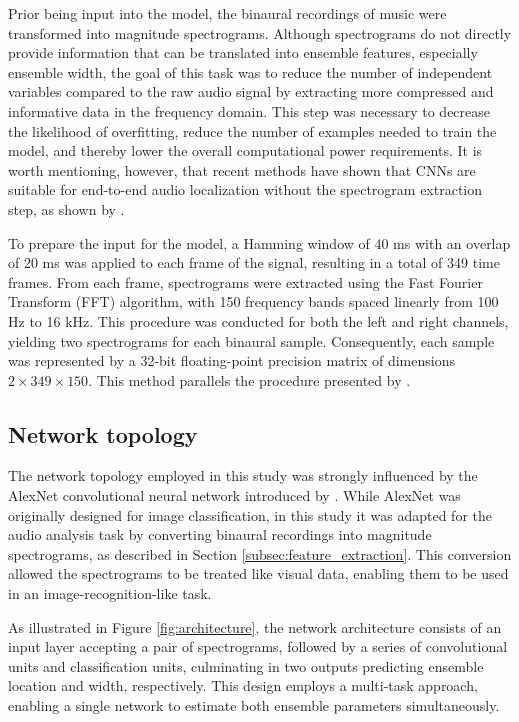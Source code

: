 \documentclass[11pt]{article}
\begin{document}
Prior being input into the model, the binaural recordings of music were transformed into magnitude spectrograms. Although spectrograms do not directly provide information that can be translated into ensemble features, especially ensemble width, the goal of this task was to reduce the number of independent variables compared to the raw audio signal by extracting more compressed and informative data in the frequency domain. This step was necessary to decrease the likelihood of overfitting, reduce the number of examples needed to train the model, and thereby lower the overall computational power requirements. It is worth mentioning, however, that recent methods have shown that CNNs are suitable for end-to-end audio localization without the spectrogram extraction step, as shown by \textcite{vera-diaz_towards_2018, vecchiotti_end--end_2019}.

To prepare the input for the model, a Hamming window of 40 ms with an overlap of 20 ms was applied to each frame of the signal, resulting in a total of 349 time frames. From each frame, spectrograms were extracted using the Fast Fourier Transform (FFT) algorithm, with 150 frequency bands spaced linearly from 100 Hz to 16 kHz. This procedure was conducted for both the left and right channels, yielding two spectrograms for each binaural sample. Consequently, each sample was represented by a 32-bit floating-point precision matrix of dimensions $2 \times 349 \times 150$. This method parallels the procedure presented by \textcite{zielinski_automatic_2022}.

\subsection{Network topology}
\label{subsec:topology}

The network topology employed in this study was strongly influenced by the AlexNet convolutional neural network introduced by \textcite{krizhevsky_imagenet_2012}. While AlexNet was originally designed for image classification, in this study it was adapted for the audio analysis task by converting binaural recordings into magnitude spectrograms, as described in Section \ref{subsec:feature_extraction}. This conversion allowed the spectrograms to be treated like visual data, enabling them to be used in an image-recognition-like task.

As illustrated in Figure \ref{fig:architecture}, the network architecture consists of an input layer accepting a pair of spectrograms, followed by a series of convolutional units and classification units, culminating in two outputs predicting ensemble location and width, respectively. This design employs a multi-task approach, enabling a single network to estimate both ensemble parameters simultaneously.
\end{document}
